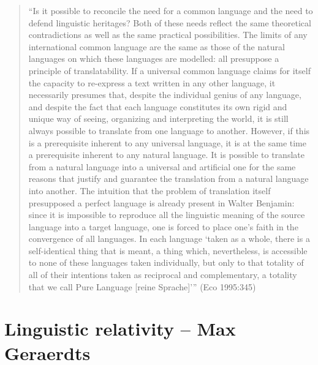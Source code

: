\begin{quote}
\begin{singlespace}
“Is it possible to reconcile the need for a common language and the need to defend linguistic heritages? Both of these needs reflect the same theoretical contradictions as well as the same practical possibilities. The limits of any international common language are the same as those of the natural languages on which these languages are modelled: all presuppose a principle of translatability. If a universal common language claims for itself the capacity to re-express a text written in any other language, it necessarily presumes that, despite the individual genius of any language, and despite the fact that each language constitutes its own rigid and unique way of seeing, organizing and interpreting the world, it is still always possible to translate from one language to another. However, if this is a prerequisite inherent to any universal language, it is at the same time a prerequisite inherent to any natural language. It is possible to translate from a natural language into a universal and artificial one for the same reasons that justify and guarantee the translation from a natural language into another. The intuition that the problem of translation itself presupposed a perfect language is already present in Walter Benjamin: since it is impossible to reproduce all the linguistic meaning of the source language into a target language, one is forced to place one’s faith in the convergence of all languages. In each language ‘taken as a whole, there is a self-identical thing that is meant, a thing which, nevertheless, is accessible to none of these languages taken individually, but only to that totality of all of their intentions taken as reciprocal and complementary, a totality that we call Pure Language [reine Sprache]’” (Eco 1995:345)
\end{singlespace}
\end{quote}

\section{Linguistic relativity -- {\small Max Geraerdts}}

